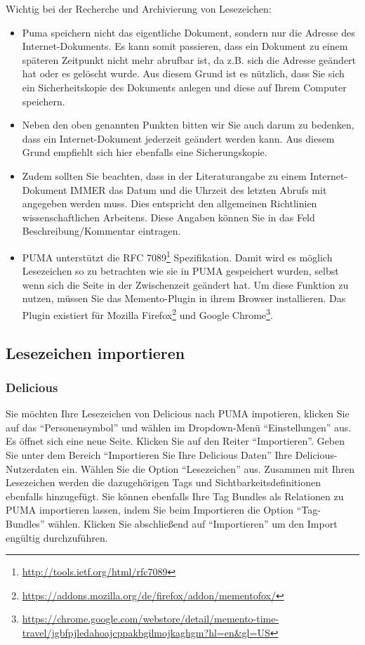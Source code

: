 \documentclass[a4paper,11pt,twoside]{scrbook}
\begin{document}
Wichtig bei der Recherche und Archivierung von Lesezeichen:
\begin{itemize}
    \item Puma speichern nicht das eigentliche Dokument, sondern nur die Adresse des Internet-Dokuments. Es kann somit passieren, dass ein Dokument zu einem späteren Zeitpunkt nicht mehr abrufbar ist, da z.B. sich die Adresse geändert hat oder es gelöscht wurde.  Aus diesem Grund ist es nützlich, dass Sie sich ein Sicherheitskopie des Dokuments anlegen und diese auf Ihrem Computer speichern.
    \item Neben den oben genannten Punkten bitten wir Sie auch darum zu bedenken, dass ein Internet-Dokument jederzeit geändert werden kann. Aus diesem Grund empfiehlt sich hier ebenfalls eine Sicherungskopie. 
    \item Zudem sollten Sie beachten, dass in der Literaturangabe zu einem Internet-Dokument IMMER das Datum und die Uhrzeit des letzten Abrufs mit angegeben werden muss. Dies entspricht den allgemeinen Richtlinien wissenschaftlichen Arbeitens. Diese Angaben können Sie in das Feld Beschreibung/Kommentar eintragen.
    \item PUMA unterstützt die RFC 7089\footnote{\url{http://tools.ietf.org/html/rfc7089}} Spezifikation. Damit wird es möglich Lesezeichen so zu betrachten wie sie in PUMA gespeichert wurden, selbst wenn sich die Seite in der Zwischenzeit geändert hat. Um diese Funktion zu nutzen, müssen Sie das Memento-Plugin in ihrem Browser installieren. Das Plugin existiert für Mozilla Firefox\footnote{\url{https://addons.mozilla.org/de/firefox/addon/mementofox/}} und Google Chrome\footnote{\url{https://chrome.google.com/webstore/detail/memento-time-travel/jgbfpjledahoajcppakbgilmojkaghgm?hl=en&gl=US}}. 
\end{itemize} 
\subsection{Lesezeichen importieren}
\subsubsection{Delicious}
Sie möchten Ihre Lesezeichen von Delicious nach PUMA impotieren, klicken Sie auf das \enquote{Personensymbol} und wählen im Dropdown-Menü \enquote{Einstellungen} aus. Es öffnet sich eine neue Seite. Klicken Sie auf den Reiter \enquote{Importieren}. Geben Sie unter dem Bereich \enquote{Importieren Sie Ihre Delicious Daten} Ihre Delicious-Nutzerdaten ein. Wählen Sie die Option \enquote{Lesezeichen} aus. Zusammen mit Ihren Lesezeichen werden die dazugehörigen Tags und Sichtbarkeitsdefinitionen ebenfalls hinzugefügt.
\newline Sie können ebenfalls Ihre Tag Bundles als Relationen zu PUMA importieren lassen, indem Sie beim Importieren die Option \enquote{Tag-Bundles} wählen. 
\newline Klicken Sie abschließend auf \enquote{Importieren} um den Import engültig durchzuführen.
\end{document}
